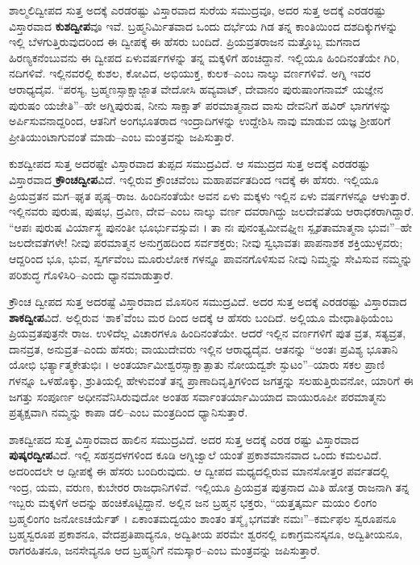 ಶಾಲ್ಮಲಿದ್ವೀಪದ ಸುತ್ತ ಅದಕ್ಕೆ ಎರಡರಷ್ಟು ವಿಸ್ತಾರವಾದ ಸುರೆಯ ಸಮುದ್ರವೂ, ಅದರ ಸುತ್ತ ಅದಕ್ಕೆ ಎರಡರಷ್ಟು ವಿಸ್ತಾರವಾದ \textbf{ಕುಶದ್ವೀಪ}ವೂ ಇವೆ. ಬ್ರಹ್ಮನಿರ್ಮಿತವಾದ ಒಂದು ದರ್ಭೆಯ ಗಿಡ ತನ್ನ ಕಾಂತಿಯಿಂದ ದಶದಿಕ್ಕುಗಳನ್ನು ಇಲ್ಲಿ ಬೆಳಗುತ್ತಿರುವುದರಿಂದ ಈ ದ್ವೀಪಕ್ಕೆ ಈ ಹೆಸರು ಬಂದಿದೆ. ಪ್ರಿಯವ್ರತರಾಜನ ಮತ್ತೊಬ್ಬ ಮಗನಾದ ಹಿರಣ್ಯಕನೆಂಬುವನು ಈ ದ್ವೀಪದ ಏಳುವರ್ಷಗಳನ್ನು ತನ್ನ ಮಕ್ಕಳಿಗೆ ಹಂಚಿದ್ದಾನೆ. ಇಲ್ಲಿಯೂ ಹಿಂದಿನಂತೆಯೇ ಗಿರಿ, ನದಿಗಳಿವೆ. ಇಲ್ಲಿನವರಲ್ಲಿ ಕುಶಲ, ಕೋವಿದ, ಅಭಿಯುಕ್ತ, ಕುಲಕ–ಎಂಬ ನಾಲ್ಕು ವರ್ಣಗಳಿವೆ. ಅಗ್ನಿ ಇವರ ಆರಾಧ್ಯದೈವ. “ಪರಸ್ಯ, ಬ್ರಹ್ಮಣಸ್ಸಾಕ್ಷಾಜ್ಜಾತ ವೇದೋಸಿ ಹವ್ಯವಾಟ್, ದೇವಾನಂ ಪುರುಷಾಂಗನಾಮ್ ಯಜ್ಞೇನ ಪುರುಷಂ ಯಜೇತಿ”–ಹೇ ಅಗ್ನಿಪುರುಷ, ನೀನು ಸಾಕ್ಷಾತ್ ಪರಮಾತ್ಮನಾದ ವಾಸು ದೇವನಿಗೆ ಹವಿರ್ ಭಾಗಗಳನ್ನು ಅರ್ಪಿಸುವನಾದ್ದರಿಂದ, ಆತನಿಗೆ ಅಂಗಭೂತರಾದ ಇಂದ್ರಾದಿಗಳನ್ನು ಉದ್ದೇಶಿಸಿ ನಾವು ಮಾಡುವ ಯಜ್ಞ ಶ್ರೀಹರಿಗೆ ಪ್ರೀತಿಯುಂಟಾಗುವಂತೆ ಮಾಡು–ಎಂಬ ಮಂತ್ರವನ್ನು ಜಪಿಸುತ್ತಾರೆ.

ಕುಶದ್ವೀಪದ ಸುತ್ತ ಅದರಷ್ಟೇ ವಿಸ್ತಾರವಾದ ತುಪ್ಪದ ಸಮುದ್ರವಿದೆ. ಆ ಸಮುದ್ರದ ಸುತ್ತ ಅದಕ್ಕೆ ಎರಡರಷ್ಟು ವಿಸ್ತಾರವಾದ \textbf{ಕ್ರೌಂಚದ್ವೀಪ}ವಿದೆ. ಇಲ್ಲಿರುವ ಕ್ರೌಂಚವೆಂಬ ಮಹಾಪರ್ವತದಿಂದ ಇದಕ್ಕೆ ಈ ಹೆಸರು. ಇಲ್ಲಿಯೂ ಪ್ರಿಯವ್ರತನ ಮಗ–ಘೃತ ಪೃಷ್ಠ–ರಾಜ. ಹಿಂದಿನಂತೆಯೇ ಅವನ ಏಳು ಮಕ್ಕಳು ಇಲ್ಲಿನ ಏಳು ವರ್ಷಗಳನ್ನೂ ಆಳುತ್ತಾರೆ. ಇಲ್ಲಿನವರು ಪುರುಷ, ಪುಷಭ, ದ್ರವಿಣ, ದೇವ–ಎಂಬ ನಾಲ್ಕು ವರ್ಣ ದವರಾಗಿದ್ದು ಜಲದೇವತೆಯ ಆರಾಧಕರಾಗಿದ್ದಾರೆ. “ಆಪಃ ಪುರುಷ ವಿರ್ಯಾಸ್ಥ ಪುನಂತೀ ಭೂರ್ಭುವಸ್ಸುವಃ । ತಾ ನಃ ಪುನಂತ್ವಮೀವಘ್ನೀಃ ಸ್ಪೃಶತಾಮಾತ್ಮನಾ ಭುವಃ”–ಹೇ ಜಲದೇವತೆಗಳೇ! ನೀವು ಪರಮಾತ್ಮನ ಅನುಗ್ರಹದಿಂದ ಸರ್ವಶಕ್ತರು; ನೀವು ಸ್ವಭಾವತಃ ಪಾಪನಾಶಕ ಶಕ್ತಿಯುಳ್ಳವರು; ಆದ್ದರಿಂದ ಭೂ, ಭುವ, ಸ್ವರ್ಗವೆಂಬ ಮೂರುಲೋಕ ಗಳನ್ನೂ ಪಾವನಗೊಳಿಸುವ ನೀವು ನಿಮ್ಮನ್ನು ಸೇವಿಸುವ ನಮ್ಮನ್ನು ಪರಿಶುದ್ಧ ಗೊಳಿಸಿರಿ–ಎಂದು ಧ್ಯಾನಮಾಡುತ್ತಾರೆ.

ಕ್ರೌಂಚ ದ್ವೀಪದ ಸುತ್ತ ಅದರಷ್ಟೆ ವಿಸ್ತಾರವಾದ ಮೊಸರಿನ ಸಮುದ್ರವಿದೆ. ಅದರ ಸುತ್ತ ಅದಕ್ಕೆ ಎರಡರಷ್ಟು ವಿಸ್ತಾರವಾದ \textbf{ಶಾಕದ್ವೀಪ}ವಿದೆ. ಅಲ್ಲಿರುವ ‘ಶಾಕ’ವೆಂಬ ಮರ ದಿಂದ ಅದಕ್ಕೆ ಆ ಹೆಸರು ಬಂದಿದೆ. ಅಲ್ಲಿಯೂ ಮೇಧಾತಿಥಿಯೆಂಬ ಪ್ರಿಯವ್ರತಪುತ್ರನೇ ರಾಜ. ಉಳಿದೆಲ್ಲ ವಿಚಾರಗಳೂ ಹಿಂದಿನಂತೆಯೇ. ಆದರೆ ಇಲ್ಲಿನ ವರ್ಣಗಳಿಗೆ ಪುತ ವ್ರತ, ಸತ್ಯವ್ರತ, ದಾನವ್ರತ, ಅನುವ್ರತ–ಎಂದು ಹೆಸರು; ವಾಯುದೇವರು ಇಲ್ಲಿನ ಆರಾಧ್ಯದೈವ. ಆತನನ್ನು “ಅಂತಃ ಪ್ರವಿಶ್ಯ ಭೂತಾನಿ ಯೋಭಿ ಭರ್ತ್ಯಾತ್ಮಕೇತುಭಿಃ । ಅಂತರ್ಯಾಮೀಶ್ವರಸ್ಸಾಕ್ಷಾತ್ಪಾತು ನೋಯದ್ವಶೇ ಸ್ಫುಟಂ”–ಯಾರು ಸಕಲ ಪ್ರಾಣಿ ಗಳನ್ನೂ ಒಳಹೊಕ್ಕು, ಶ್ರುತಿಯಲ್ಲಿ ಹೇಳುವಂತೆ ತನ್ನ ಪ್ರಾಣಾದಿವೃತ್ತಿಗಳಿಂದ ಜಗತ್ತನ್ನು ಸಲಹುತ್ತಿರುವನೋ, ಯಾರಿಗೆ ಈ ಜಗತ್ತು ಸಂಪೂರ್ಣ ಅಧೀನವೆನಿಸಿರುವುದೋ ಅಂತಹ ಸರ್ವಾಂತರ್ಯಾಮಿಯಾದ ವಾಯುರೂಪೀ ಪರಮಾತ್ಮನು ಪ್ರತ್ಯಕ್ಷವಾಗಿ ನಮ್ಮನ್ನು ಕಾಪಾ ಡಲಿ–ಎಂಬ ಮಂತ್ರದಿಂದ ಧ್ಯಾನಿಸುತ್ತಾರೆ.

ಶಾಕದ್ವೀಪದ ಸುತ್ತ ವಿಸ್ತಾರವಾದ ಹಾಲಿನ ಸಮುದ್ರವಿದೆ. ಅದರ ಸುತ್ತ ಅದಕ್ಕೆ ಎರಡ ರಷ್ಟು ವಿಸ್ತಾರವಾದ \textbf{ಪುಷ್ಕರದ್ವೀಪ}ವಿದೆ. ಇಲ್ಲಿ ಸಹಸ್ರದಳಗಳಿಂದ ಕೂಡಿ ಅಗ್ನಿಜ್ವಾಲೆ ಯಂತೆ ಪ್ರಕಾಶಮಾನವಾದ ಒಂದು ಕಮಲವಿದೆ. ಅದರಿಂದಲೇ ಆ ದ್ಪೀಪಕ್ಕೆ ಈ ಹೆಸರು ಬಂದಿರುವುದು. ಆ ದ್ವೀಪದ ಮಧ್ಯದಲ್ಲಿರುವ ಮಾನಸೋತ್ತರ ಪರ್ವತದಲ್ಲಿ ಇಂದ್ರ, ಯಮ, ವರುಣ, ಕುಬೇರರ ರಾಜಧಾನಿಗಳಿವೆ. ಇಲ್ಲಿಯೂ ಪ್ರಿಯವ್ರತ ಪುತ್ರನಾದ ಮಿತಿ ಹೋತ್ರ ರಾಜನಾಗಿ ತನ್ನ ಇಬ್ಬರು ಮಕ್ಕಳಿಗೆ ಅದನ್ನು ಹಂಚಿಕೊಟ್ಟಿದ್ದಾನೆ. ಅಲ್ಲಿನ ಜನ ಬ್ರಹ್ಮನ ಭಕ್ತರು, “ಯತ್ತತ್ಕರ್ಮ ಮಯಂ ಲಿಂಗಂ ಬ್ರಹ್ಮಲಿಂಗಂ ಜನೋಽಚರ್ಯೆತ್​ । ಏಕಾಂತಮದ್ವಯಂ ಶಾಂತಂ ತಸ್ಮೈ ಭಗವತೇ ನಮಃ”–ಕರ್ಮಫಲ ಸ್ವರೂಪನೂ ಬ್ರಹ್ಮಸ್ವರೂಪ ಪ್ರಕಾಶನೂ, ವೇದಪ್ರತಿಪಾದ್ಯನೂ, ಅದ್ವಿತೀಯ ಪರಮೇ ಶ್ವರನಲ್ಲಿ ಏಕಾಗ್ರಮನಸ್ಕನೂ, ಅದ್ವಿತೀಯನೂ, ರಾಗರಹಿತನೂ, ಜನಸೇವ್ಯನೂ ಆದ ಬ್ರಹ್ಮನಿಗೆ ನಮಸ್ಕಾರ–ಎಂಬ ಮಂತ್ರವನ್ನು ಜಪಿಸುತ್ತಾರೆ.

